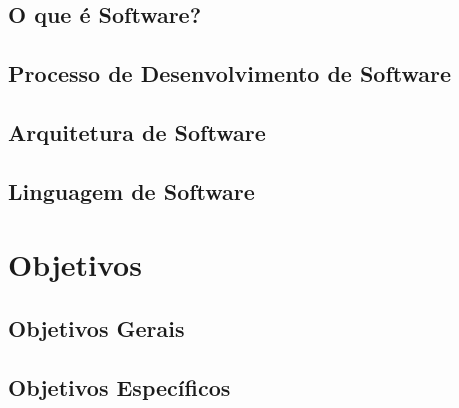 \subsection{O que é Software?}

\subsection{Processo de Desenvolvimento de Software}

\subsection{Arquitetura de Software}

\subsection{Linguagem de Software}

\section{Objetivos}

\subsection{Objetivos Gerais}

\subsection{Objetivos Específicos}


